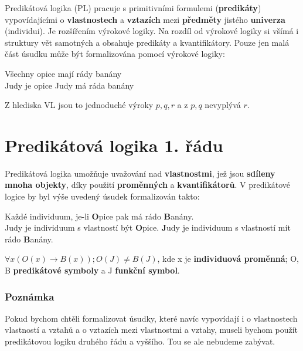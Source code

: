 Predikátová logika (PL) pracuje s primitivními formulemi (\textbf{predikáty}) vypovídajícími o \textbf{vlastnostech} a \textbf{vztazích} mezi \textbf{předměty} jistého \textbf{univerza} (individui). Je rozšířením výrokové logiky. Na rozdíl od výrokové logiky si všímá i struktury vět samotných a obsahuje predikáty a kvantifikátory. Pouze jen malá část úsudku může být formalizována pomocí výrokové logiky:

\begin{center}
    \begin{minipage}{0.5\textwidth}
        Všechny opice mají rády banány
        \\
        Judy je opice
        \resline
        Judy má ráda banány
    \end{minipage}
\end{center}

Z hlediska VL jsou to jednoduché výroky
$p, q, r$ a z $p, q$ nevyplývá $r$.


\section{Predikátová logika 1. řádu}
Predikátová logika umožňuje uvažování nad \textbf{vlastnostmi}, jež jsou \textbf{sdíleny mnoha objekty}, díky použití \textbf{proměnných} a \textbf{kvantifikátorů}. V predikátové logice by byl výše uvedený úsudek formalizován takto:

\begin{center}
    \begin{minipage}{0.7\textwidth}
        Každé individuum, je-li \textbf{O}pice pak má rádo \textbf{B}anány.\\
        {J}udy je individuum s vlastností být \textbf{O}pice.
        \resline
        \textbf{J}udy je individuum s vlastností mít rádo \textbf{B}anány.
    \end{minipage}
\end{center}

$\forall x (O(x) \rightarrow B(x)); O(J) \neq B(J)$, kde x je \textbf{individuová proměnná}; O, B \textbf{predikátové symboly} a J \textbf{funkční symbol}.

\subsubsection*{Poznámka} Pokud bychom chtěli formalizovat úsudky, které navíc vypovídají i o vlastnostech vlastností a vztahů a o vztazích mezi vlastnostmi a vztahy, museli bychom použít predikátovou logiku druhého řádu a vyššího. Tou se ale nebudeme zabývat.

